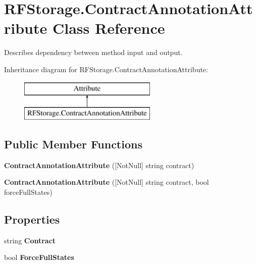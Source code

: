 \hypertarget{class_r_f_storage_1_1_contract_annotation_attribute}{}\section{R\+F\+Storage.\+Contract\+Annotation\+Attribute Class Reference}
\label{class_r_f_storage_1_1_contract_annotation_attribute}


Describes dependency between method input and output.  


Inheritance diagram for R\+F\+Storage.\+Contract\+Annotation\+Attribute\+:\begin{figure}[H]
\begin{center}
\leavevmode
\includegraphics[height=2.000000cm]{class_r_f_storage_1_1_contract_annotation_attribute}
\end{center}
\end{figure}
\subsection*{Public Member Functions}
\begin{DoxyCompactItemize}
\item 
\mbox{\label{class_r_f_storage_1_1_contract_annotation_attribute_a725a00696a616223084ad436b7a37034}} 
{\bfseries Contract\+Annotation\+Attribute} (\mbox{[}Not\+Null\mbox{]} string contract)
\item 
\mbox{\label{class_r_f_storage_1_1_contract_annotation_attribute_aeae026f00acf5d8e7df36e9ce182c23b}} 
{\bfseries Contract\+Annotation\+Attribute} (\mbox{[}Not\+Null\mbox{]} string contract, bool force\+Full\+States)
\end{DoxyCompactItemize}
\subsection*{Properties}
\begin{DoxyCompactItemize}
\item 
\mbox{\label{class_r_f_storage_1_1_contract_annotation_attribute_a8a8954367bcc8bda30130790513a5ac3}} 
string {\bfseries Contract}
\item 
\mbox{\label{class_r_f_storage_1_1_contract_annotation_attribute_a978e413c4ab52eb74be30fe454083d6f}} 
bool {\bfseries Force\+Full\+States}
\end{DoxyCompactItemize}


